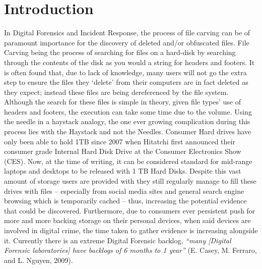 
\chapter{Introduction}
\label{chap:chapter1}
In Digital Forensics and Incident Response, the process of file carving can be of paramount importance for the discovery of deleted and/or obfuscated files.
File Carving being the process of searching for files on a hard-disk by searching through the contents of the disk as you would a string for headers and footers.
It is often found that, due to lack of knowledge, many users will not go the extra step to ensure the files they `delete' from their computers are in fact deleted as they expect; instead these files are being dereferenced by the file system.
Although the search for these files is simple in theory, given file types’ use of headers and footers, the execution can take some time due to the volume.
Using the needle in a haystack analogy, the one ever growing complication during this process lies with the Haystack and not the Needles.
Consumer Hard drives have only been able to hold 1TB since 2007 when Hitatchi first announced their consumer grade Internal Hard Disk Drive at the Consumer Electronics Show (CES).
Now, at the time of writing, it can be considered standard for mid-range laptops and desktops to be released with 1 \acs{TB} Hard Disks.
Despite this vast amount of storage users are provided with they still regularly manage to fill these drives with files -- especially from social media sites and general search engine browsing which is temporarily cached -- thus, increasing the potential evidence that could be discovered.
Furthermore, due to consumers ever persistent push for more and more backing storage on their personal devices, when said devices are involved in digital crime, the time taken to gather evidence is increasing alongside it.
Currently there is an extreme Digital Forensic backlog, \textit{``many [Digital Forensic laboratories] have backlogs of 6 months to 1 year''} (E. Casey, M. Ferraro, and L. Nguyen, 2009).


